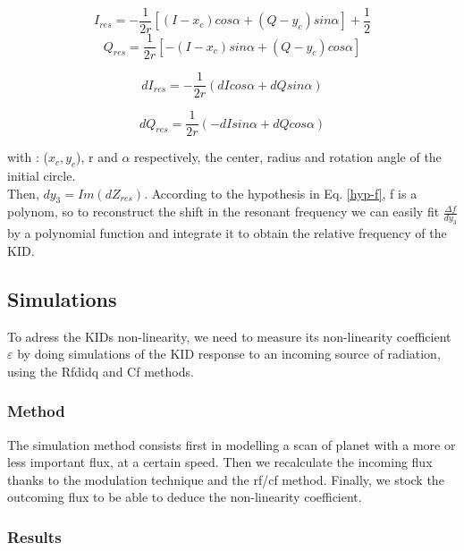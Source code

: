 \begin{equation}
I_{res} = - \frac{1}{2r}[(I-x_{c})cos\alpha + (Q - y_{c})sin \alpha] + \frac{1}{2}
\end{equation}
\begin{equation}
 Q_{res} = \frac{1}{2r}[-(I-x_{c})sin\alpha + (Q - y_{c})cos \alpha] 
\end{equation}

\begin{equation}
dI_{res} = -\frac{1}{2r}(dI cos\alpha + dQ sin\alpha)
\end{equation}

\begin{equation}
dQ_{res} = \frac{1}{2r}(-dI sin\alpha + dQ cos\alpha)
\end{equation}

with : ($x_{c}, y_{c}$), r and $\alpha$ respectively, the center, radius and rotation angle of the initial circle.\\
Then, $dy_{3} = Im(dZ_{res})$. According to the hypothesis in Eq. \ref{hyp-f}, f is a polynom, so to reconstruct the shift in the resonant frequency we can easily fit $\frac{\Delta f}{dy_{3}}$ by a polynomial function and integrate it to obtain the relative frequency of the KID.


\subsection{Simulations}
To adress the KIDs non-linearity, we need to measure its non-linearity coefficient $\varepsilon$ by doing simulations of the KID response to an incoming source of radiation, using the Rfdidq and Cf methods.

	\subsubsection{Method}
The simulation method consists first in modelling a scan of planet with a more or less important flux, at a certain speed. Then we recalculate the incoming flux thanks to the modulation technique and the rf/cf method. Finally, we stock the outcoming flux to be able to deduce the non-linearity coefficient.

	\subsubsection{Results}

